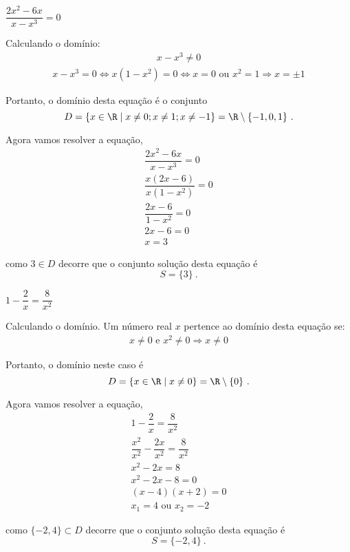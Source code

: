  \begin{exem} $\dfrac{2x^2 - 6x}{x - x^3}= 0$
 
 Calculando o domínio:
 \begin{eqnarray}
 x - x^3 \neq 0 
 \end{eqnarray}
 \begin{eqnarray}
 x - x^3 = 0 \Leftrightarrow x(1-x^2)= 0 \Leftrightarrow x= 0 \text{ ou } x^2= 1 \Rightarrow x= \pm 1
 \end{eqnarray}
 
 Portanto, o domínio desta equação é o conjunto
 \[D= \{ x \in \R \mid x \neq 0; x \neq 1; x \neq -1 \}= \R \setminus \{-1, 0, 1\} \ . \]
 
 Agora vamos resolver a equação,
 \begin{eqnarray}
 \dfrac{2x^2 - 6x}{x - x^3}= 0 \\
 \dfrac{x(2x - 6)}{x(1 - x^2)}= 0 \\
 \dfrac{2x - 6}{1 - x^2}= 0 \\
 2x - 6= 0 \\
 x= 3
 \end{eqnarray}
 
 como $3 \in D$ decorre que o conjunto solução desta equação é
 \[S= \{ 3 \} \ . \]
 \end{exem}
 
 \begin{exem} $1 - \dfrac{2}{x}= \dfrac{8}{x^2}$
 
 Calculando o domínio. Um número real $x$ pertence ao domínio desta equação se:
 \begin{eqnarray}
  x \neq 0 \text{ e } x^2 \neq 0 \Rightarrow x \neq 0
 \end{eqnarray}
 
 Portanto, o domínio neste caso é
 \[D= \{ x \in \R \mid x \neq 0 \}= \R \setminus \{0\} \ . \]
 
 Agora vamos resolver a equação,
 \begin{eqnarray}
 1 - \dfrac{2}{x}= \dfrac{8}{x^2} \\
 \dfrac{x^2}{x^2} - \dfrac{2x}{x^2}= \dfrac{8}{x^2} \\
 x^2 - 2x= 8 \\
 x^2 -2x -8= 0 \\
 (x-4)(x+2)= 0 \\
 x_1= 4 \text{ ou } x_2= -2
 \end{eqnarray}
 
 como $\{-2, 4\} \subset D$ decorre que o conjunto solução desta equação é
 \[S= \{ -2, 4 \} \ . \]
 \end{exem}
 
